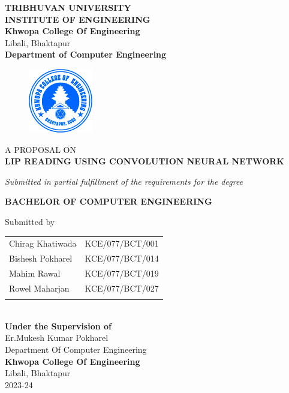 	\begin{center}
		\thispagestyle{empty}
		\Large\textbf{TRIBHUVAN UNIVERSITY}\\
		\Large\textbf{INSTITUTE OF ENGINEERING }\\
		\vspace{0.2in}
		\large{\textbf{Khwopa College Of Engineering}\\}
		\normalsize{Libali, Bhaktapur\\}
		\large\textbf{Department of Computer Engineering}
		\vspace{0.2in}
		\begin{figure}[h]
		    \centering
			    \includegraphics[width=0.25\textwidth]{img/Khwopalogo.jpg}
		\end{figure}
		
		\vspace{0.2in}
		\large{A PROPOSAL ON\\\textbf{LIP READING USING CONVOLUTION NEURAL NETWORK}\\}
		
		\vspace{0.2in}
		\large{\textit{Submitted in partial fulfillment of the requirements for the degree\\}}
		
		\vspace{0.2in}
		\large{\textbf{BACHELOR OF COMPUTER ENGINEERING}\\}
		
		\vspace{0.2in}
		\large{Submitted by}\\
		\begin{tabular}{p{3.5in}p{3in}}
			\hspace{0.3cm}Chirag Khatiwada & KCE/077/BCT/001\\
			\hspace{0.3cm}Bishesh Pokharel & KCE/077/BCT/014\\
			\hspace{0.3cm}Mahim Rawal & KCE/077/BCT/019\\
			\hspace{0.3cm}Rowel Maharjan & KCE/077/BCT/027\\
		 \vspace{0.2in}
		\end{tabular}
		\\
		\vspace{1cm}
		\large{\textbf{Under the Supervision of}\\}
			\normalsize{Er.Mukesh Kumar Pokharel\\
				Department Of Computer Engineering\\
			}
			\vspace{2cm}
		\large{\textbf{Khwopa College Of Engineering}\\}
			\normalsize{Libali, Bhaktapur\\
			2023-24
		}
	\end{center}
